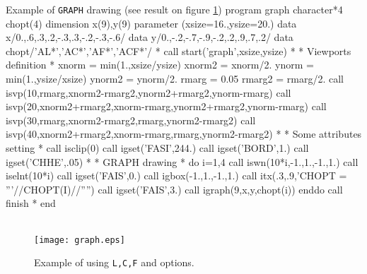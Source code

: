 \newpage
\begin{XMPt}{Example of {\tt GRAPH} drawing (see result on figure \ref{GRAPH})}
      program  graph 
      character*4 chopt(4)
      dimension x(9),y(9)
      parameter (xsize=16.,ysize=20.)
      data x/0.,.6,.3,.2,-.3,.3,-.2,-.3,-.6/
      data y/0.,-.2,-.7,-.9,-.2,.2,.9,.7,.2/
      data chopt/'AL*','AC*','AF*','ACF*'/
*
      call start('graph',xsize,ysize)
*
*              Viewports definition
*
      xnorm  = min(1.,xsize/ysize)
      xnorm2 = xnorm/2.
      ynorm  = min(1.,ysize/xsize)
      ynorm2 = ynorm/2.
      rmarg  = 0.05
      rmarg2 = rmarg/2.
      call isvp(10,rmarg,xnorm2-rmarg2,ynorm2+rmarg2,ynorm-rmarg)
      call isvp(20,xnorm2+rmarg2,xnorm-rmarg,ynorm2+rmarg2,ynorm-rmarg)
      call isvp(30,rmarg,xnorm2-rmarg2,rmarg,ynorm2-rmarg2)
      call isvp(40,xnorm2+rmarg2,xnorm-rmarg,rmarg,ynorm2-rmarg2)
*
*              Some attributes setting
*
      call isclip(0)
      call igset('FASI',244.)
      call igset('BORD',1.)
      call igset('CHHE',.05)
*
*              GRAPH drawing
*
      do i=1,4
         call iswn(10*i,-1.,1.,-1.,1.)
         call iselnt(10*i)
         call igset('FAIS',0.)
         call igbox(-1.,1.,-1.,1.)
         call itx(.3,.9,'CHOPT = '''//CHOPT(I)//'''')
         call igset('FAIS',3.)
         call igraph(9,x,y,chopt(i))
      enddo
      call finish
*
      end
\end{XMPt}

\begin{figure}[p]
\begin{center}
\mbox{}\\[-1cm]
\texttt{[image: graph.eps]}
\end{center}
\caption{Example of \protect{} using {\tt L,C,F} and {\tt*} options.}
\label{GRAPH}
\end{figure}
\clearpage 

